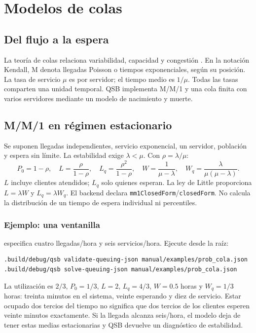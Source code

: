 \chapter{Modelos de colas}
\label{ch:colas}

\section{Del flujo a la espera}
La teoría de colas relaciona variabilidad, capacidad y congestión
\cite{gross2008fundamentals}. En la notación Kendall, M denota llegadas
Poisson o tiempos exponenciales, según su posición. La tasa de servicio
\(\mu\) es por servidor; el tiempo medio es \(1/\mu\). Todas las tasas
comparten una unidad temporal. QSB implementa M/M/1 y una cola finita con
varios servidores mediante un modelo de nacimiento y muerte.

\section{M/M/1 en régimen estacionario}
Se suponen llegadas independientes, servicio exponencial, un servidor,
población y espera sin límite. La estabilidad exige \(\lambda<\mu\).
Con \(\rho=\lambda/\mu\):
\[
 P_0=1-\rho,\quad L=\frac{\rho}{1-\rho},\quad
 L_q=\frac{\rho^2}{1-\rho},\quad
 W=\frac1{\mu-\lambda},\quad W_q=\frac{\lambda}{\mu(\mu-\lambda)}.
\]
\(L\) incluye clientes atendidos; \(L_q\) solo quienes esperan. La ley de
Little proporciona \(L=\lambda W\) y \(L_q=\lambda W_q\).
El backend declara \texttt{mm1ClosedForm}/\texttt{closedForm}. No calcula
la distribución de un tiempo de espera individual ni percentiles.

\subsection{Ejemplo: una ventanilla}
 especifica cuatro llegadas/hora y
seis servicios/hora. Ejecute desde la raíz:
\begin{lstlisting}
.build/debug/qsb validate-queuing-json manual/examples/prob_cola.json
.build/debug/qsb solve-queuing-json manual/examples/prob_cola.json
\end{lstlisting}
La utilización es \(2/3\), \(P_0=1/3\), \(L=2\), \(L_q=4/3\),
\(W=0.5\) horas y \(W_q=1/3\) horas: treinta minutos en el sistema,
veinte esperando y diez de servicio. Estar ocupado dos tercios del tiempo no
significa que dos tercios de los clientes esperen veinte minutos exactamente.
Si la llegada alcanza seis/hora, el modelo deja de tener estas medias
estacionarias y QSB devuelve un diagnóstico de estabilidad.

